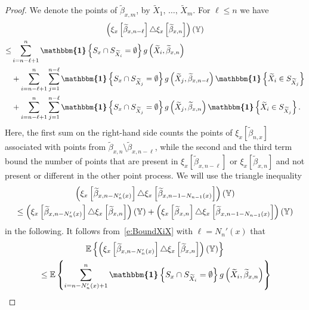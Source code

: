 \documentclass[10pt]{amsart}
\theoremstyle{definition}\newtheorem{defi}[theo]{Definition}\newtheorem{rema}[theo]{Remark}\newtheorem{exam}[theo]{Example}\newtheorem{exem}[theo]{Example}\newtheorem{nota}[theo]{Notation}
\newcommand*\Y{\mathbb{Y}}
\newcommand{\E}{\mathbb{E}}
\newcommand{\mean}[1] {\E\left\{{#1}\right\}}
\newcommand{\ind}{\boldsymbol{\mathbbm{1}}}
\let\oldtilde\tilde
\renewcommand*{\tilde}[1]{\mathchoice{\widetilde{#1}}{\widetilde{#1}}{\oldtilde{#1}}{\oldtilde{#1}}}
\begin{document}
\begin{proof}
We denote the points of $\widetilde{\beta}_{x,m}$, by $\widetilde{X}_1,\,\hdots,\,\widetilde{X}_m$. For $\ell\leq n$ we have
\begin{multline}\label{e:BoundXiX}
\left(\xi_x\left[\widetilde{\beta}_{x,n-\ell}\right] \triangle \xi_x\left[\widetilde{\beta}_{x,n}\right]\right)(\Y)\\
\begin{aligned}
\leq& \sum_{i=n-\ell+1}^n \ind\left\{S_x\cap S_{\widetilde{X}_i} = \emptyset\right\} g\left(\widetilde{X}_i,\widetilde{\beta}_{x,n}\right)
\\ 
&+ \sum_{i=n-\ell+1}^n \sum_{j=1}^{n-\ell} \ind\left\{S_x \cap S_{\widetilde{X}_j} = \emptyset \right\} g\left(\widetilde{X}_j,\widetilde{\beta}_{x,n-\ell}\right) \ind\left\{\widetilde{X}_i \in S_{\widetilde{X}_j}\right\} \\
& + \sum_{i=n-\ell+1}^n \sum_{j=1}^{n-\ell} \ind
\left\{S_x \cap S_{\widetilde{X}_j} = \emptyset \right\} g\left(\widetilde{X}_j,\widetilde{\beta}_{x,n}\right) \ind\left\{\widetilde{X}_i\in S_{\widetilde{X}_j} \right\}.
\end{aligned}
\end{multline}
Here, the first sum on the right-hand side counts the points of $\xi_x[\widetilde{\beta}_{n,x}]$ associated with points from $\widetilde{\beta}_{x,n}\setminus\widetilde{\beta}_{x,n-\ell}$, while the second and the third term bound the number of points that are present in $\xi_x[\widetilde{\beta}_{x,n-\ell}]$ or $\xi_x[\widetilde{\beta}_{x,n}]$ and not present or different in the other point process. We will use the triangle inequality
\begin{multline*}
\left(\xi_x\left[\widetilde{\beta}_{x,n-N_{n}'(x)}\right] \triangle \xi_x\left[\widetilde{\beta}_{x,n-1-N_{n-1}(x)}\right]\right)(\Y) \\
\leq \left(\xi_x\left[\widetilde{\beta}_{x,n-N_n'(x)}\right] \triangle \xi_x\left[\widetilde{\beta}_{x,n}\right]\right)(\Y) + \left(\xi_x\left[\tilde{\beta}_{x,n}\right] \triangle \xi_x\left[\tilde{\beta}_{x,n-1-N_{n-1}(x)}\right]\right)(\Y)
\end{multline*}
in the following. It follows from~\eqref{e:BoundXiX} with $\ell=N_n'(x)$ that
\begin{multline*}
\mean{\left(\xi_x\left[\widetilde{\beta}_{x,n-N_n'(x)}\right] \triangle \xi_x\left[\widetilde{\beta}_{x,n}\right]\right)(\Y)}\\
\begin{aligned}
& \leq \mean{\sum_{i=n-N_n'(x)+1}^n \ind\left\{S_x \cap S_{\widetilde{X}_i} = \emptyset\right\} g\left(\widetilde{X}_i,\widetilde{\beta}_{x,n}\right)} \\

\end{aligned}
\end{multline*}
\end{proof}
\end{document}
